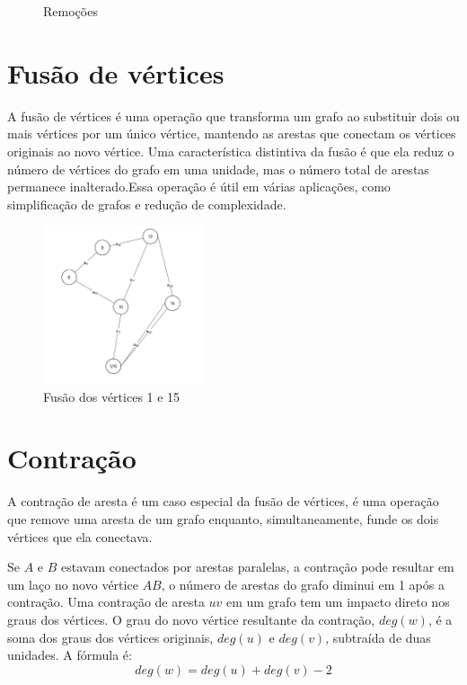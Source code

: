 \begin{figure}[!h]
		\caption{Remoções}
		\label{fig:duasRemocoes}
	\end{figure}
	
	\section{Fusão de vértices}\label{sec:fusao}
	A fusão de vértices é uma operação que transforma um grafo ao substituir dois ou mais vértices por um único vértice, mantendo as arestas que conectam os vértices originais ao novo vértice. Uma característica distintiva da fusão é que ela reduz o número de vértices do grafo em uma unidade, mas o número total de arestas permanece inalterado.Essa operação é útil em várias aplicações, como simplificação de grafos e redução de complexidade.
	
	\begin{figure}[!h]
		\centering
		\includegraphics[width=0.425\textwidth]{figuras/subgrafos/fusao.png}
		\caption{Fusão dos vértices 1 e 15}
		\label{fig:fusao}
	\end{figure}
	
	\section{Contração}\label{sec:contracao}
	A contração de aresta é um caso especial da fusão de vértices, é uma operação que remove uma aresta de um grafo enquanto, simultaneamente, funde os dois vértices que ela conectava.
	
	Se $A$ e $B$ estavam conectados por arestas paralelas, a contração pode resultar em um laço no novo vértice $AB$, o número de arestas do grafo diminui em 1 após a contração.
	Uma contração de aresta $uv$ em um grafo tem um impacto direto nos graus dos vértices. O grau do novo vértice resultante da contração, $deg(w)$, é a soma dos graus dos vértices originais, $deg(u)$ e $deg(v)$, subtraída de duas unidades. A fórmula é:
	\[
	deg(w) = deg(u) + deg(v) - 2
	\]
	
